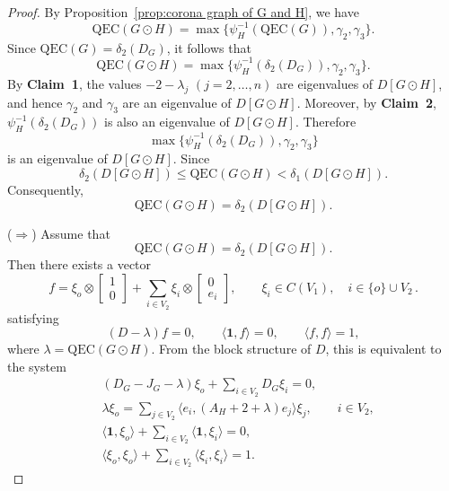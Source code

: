\documentclass[pdflatex,sn-mathphys-num]{sn-jnl}
\theoremstyle{thmstyleone}%
\theoremstyle{thmstyletwo}%
\theoremstyle{thmstylethree}%
\begin{document}
\begin{proof}
By Proposition~\ref{prop:corona graph of G and H}, we have
\[
\mathrm{QEC}(G\odot H)
=
\max\{\psi_H^{-1}(\mathrm{QEC}(G)),\gamma_2,\gamma_3\}.
\]
Since $\mathrm{QEC}(G)=\delta_2(D_G)$, it follows that
\[
\mathrm{QEC}(G\odot H)
=
\max\{\psi_H^{-1}(\delta_2(D_G)),\gamma_2,\gamma_3\}.
\]
By \textbf{Claim~1}, the values $-2-\lambda_j$ $(j=2,\dots,n)$ are eigenvalues of $D[G\odot H]$, and hence $\gamma_2$ and $\gamma_3$ are an eigenvalue of $D[G\odot H]$. 
Moreover, by \textbf{Claim~2}, $\psi_H^{-1}(\delta_2(D_G))$ is also an eigenvalue of $D[G\odot H]$. 
Therefore
\[
\max\{\psi_H^{-1}(\delta_2(D_G)),\gamma_2,\gamma_3\}
\]
is an eigenvalue of $D[G\odot H]$. Since 
\[
\delta_2(D[G\odot H])
\le
\mathrm{QEC}(G\odot H)
<
\delta_1(D[G\odot H]).
\]
Consequently,
\[
\mathrm{QEC}(G\odot H)=\delta_2(D[G\odot H]).
\]

\medskip
\noindent
($\Rightarrow$)
Assume that
\[
\mathrm{QEC}(G\odot H)=\delta_2(D[G\odot H]).
\]
Then there exists a vector
\[f=\xi_o\otimes \begin{bmatrix} 1 \\ 0 \end{bmatrix}
+ \sum_{i\in V_2} \xi_i\otimes \begin{bmatrix} 0 \\ e_i \end{bmatrix},
\qquad
\xi_i \in C(V_1),
\quad i\in \{o\}\cup V_2\,.\] satisfying
\[
(D-\lambda)f=0, \qquad 
\langle \mathbf1,f\rangle=0, \qquad 
\langle f,f\rangle=1,
\]
where $\lambda=\mathrm{QEC}(G\odot H)$.
From the block structure of $D$, this is equivalent to the
system
\begin{align}
&(D_G-J_G-\lambda)\xi_o 
+\sum_{i\in V_2}D_G\xi_i=0,
\label{05eqn:basic equation (11)}
\\
&\lambda\xi_o
=\sum_{j\in V_2} \langle e_i, (A_H+2+\lambda)e_j\rangle \xi_j,
\qquad i\in V_2,
\label{05eqn:basic equation (12)}
\\
&\langle \mathbf{1}, \xi_o\rangle
+\sum_{i\in V_2} \langle \mathbf{1}, \xi_i\rangle=0,
\label{05eqn:basic equation (13)}
\\
&\langle \xi_o, \xi_o\rangle
+\sum_{i\in V_2} \langle \xi_i, \xi_i\rangle=1.
\label{05eqn:basic equation (14)}
\end{align}


\end{proof}
\end{document}
